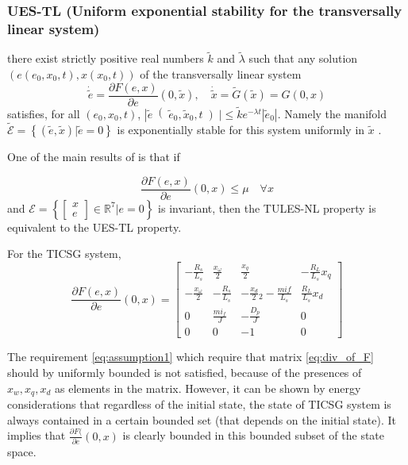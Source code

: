 \documentclass[letterpaper, 10 pt, conference]{ieeeconf}  %
\begin{document}
\subsubsection{UES-TL (Uniform exponential stability for the transversally linear system)}
there exist strictly positive real numbers $\tilde{ k}$ and $\tilde{\lambda}$  such that any solution $\left(e \left(e_0, x_0, t\right), x \left(x_0, t\right)\right)$ of the transversally linear system
$$\dot{\tilde{e}} = \frac{\partial F(e,x)}{\partial e}\left(0,\tilde{x}\right) ,\quad \dot{\tilde{x}} = \tilde{G}  \left( \tilde{x}  \right) =G\left(0,x\right)$$
satisfies, for all $\left(e_0,x_0,t\right)$,   
 $ \left| \tilde{e}\right(\tilde{e}_0,\tilde{x}_0,t \left) \right| \le \tilde{k} e^{-\lambda t} \left| \tilde{e}_0\right|$. Namely the manifold $\tilde{\mathscr{E}}=\left\{\left(\tilde{e},\tilde{x} \right)| \tilde{e} = 0 \right\}$  is exponentially stable for this system uniformly in $\tilde{x}$ .


One of the main results of \cite{AndrieuJayawardhanaPraly} is that if 

\begin{equation}
\frac{\partial F(e,x)}{\partial e}(0,x)\le \mu \quad\forall x  \label{eq:assumption1}
\end{equation}
and 
$\mathscr{E}=\left\{ \left[\begin{array}{c}
x\\
e
\end{array}\right]\in\mathbb{R}^{7}|e=0\right\} $ is invariant, then 
the TULES-NL property is equivalent to the UES-TL property.

For the TICSG system, 
\begin{equation}
\frac{\partial F(e,x)}{\partial e}(0,x)=\left[\begin{array}{cccc}
-\frac{R_{s}}{L_{s}} & \frac{x_{\omega}}{2} & \frac{x_{q}}{2} & -\frac{R_{L}}{L_{s}}x_{q}\\
-\frac{x_{\omega}}{2} & -\frac{R_{s}}{L_{s}} & -\frac{x_{d}}{2}{}_{2}-\frac{mif}{L_{s}} & \frac{R_{L}}{L_{s}}x_{d}\\
0 & \frac{mi_{f}}{J} & -\frac{D_{p}}{J} & 0\\
0 & 0 & -1 & 0
\end{array}\right]\label{eq:div_of_F}
\end{equation}

The requirement \eqref{eq:assumption1}  which require that matrix \eqref{eq:div_of_F} should by uniformly bounded is not satisfied, because of the presences of $x_{w},x_{q},x_{d}$ as elements in the matrix. However, it can be shown by energy considerations  that regardless
of the initial state, the state of TICSG system is always contained in a certain bounded set (that depends on the initial state).
It implies that $\frac{\partial F(}{\partial e}(0,x)$ is clearly bounded in this bounded subset of the state space.
\end{document}
